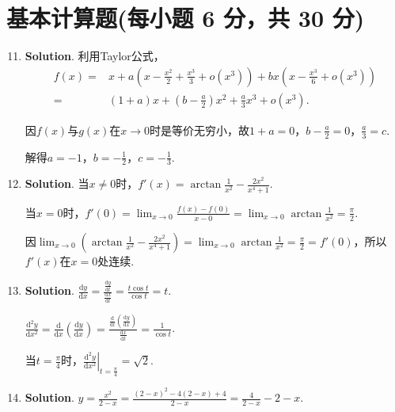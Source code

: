 \documentclass[../Main.tex]{subfiles}
\begin{document}
\section{基本计算题(每小题 6 分，共 30 分)}
\begin{enumerate}
    \setcounter{enumi}{10}
    \item \textbf{Solution}. 利用Taylor公式，
          \[
              \begin{aligned}
                  f(x)= & x+a\left(x-\frac{x^2}{2}+\frac{x^3}{3}+o(x^{3})\right)+bx\left(x-\frac{x^3}{6}+o(x^{3})\right) \\
                  =     & (1+a)x+\left(b-\frac{a}{2}\right)x^{2}+\frac{a}{3}x^{3}+o(x^{3}).
              \end{aligned}
          \]

          因$f(x)$与$g(x)$在$x\to0$时是等价无穷小，故$1+a=0$，$b-\frac{a}{2}=0$，$\frac{a}{3}
              =c$.

          解得$a=-1$，$b=-\frac{1}{2}$，$c=-\frac{1}{3}$.

    \item \textbf{Solution}. 当$x\neq0$时，$f'(x)=\arctan\frac{1}{x^{2}}-\frac{2x^{2}}{x^{4}+1}$.

          当$x=0$时，$f'(0)=\lim_{x\to0}\frac{f(x)-f(0)}{x-0}=\lim_{x\to0}\arctan\frac{1}{x^{2}}
              =\frac{\pi}{2}$.

          因$\lim_{x\to0}\left(\arctan\frac{1}{x^{2}}-\frac{2x^{2}}{x^{4}+1}\right)=\lim
              _{x\to0}\arctan\frac{1}{x^{2}}=\frac{\pi}{2}=f'(0)$，所以$f'(x)$在$x=0$处连续.

    \item \textbf{Solution}. $\frac{\mathrm{d}y}{\mathrm{d}x}=\frac{\frac{\mathrm{d}y}{\mathrm{d}t}}{\frac{\mathrm{d}x}{\mathrm{d}t}}
              =\frac{t\cos t}{\cos t}=t$.

          $\frac{\mathrm{d}^{2} y}{\mathrm{d}x^{2}}=\frac{\mathrm{d}}{\mathrm{d}x}\left
              (\frac{\mathrm{d}y}{\mathrm{d}x}\right)=\frac{\frac{\mathrm{d}}{\mathrm{d}t}\left(\frac{\mathrm{d}y}{\mathrm{d}x}\right)}{\frac{\mathrm{d}x}{\mathrm{d}t}}
              =\frac{1}{\cos t}$.

          当$t=\frac{\pi}{4}$时，$\left.\frac{\mathrm{d}^{2} y}{\mathrm{d}x^{2}}\right
              |_{t=\frac{\pi}{4}}=\sqrt{2}$.

    \item \textbf{Solution}. $y=\frac{x^{2}}{2-x}=\frac{(2-x)^{2}-4(2-x)+4}{2-x}
              =\frac{4}{2-x}-2-x$.


\end{enumerate}
\end{document}
